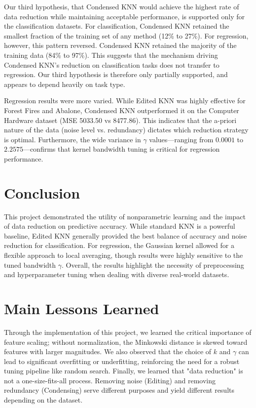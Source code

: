 \documentclass[twoside,11pt]{article}
\begin{document}
Our third hypothesis, that Condensed KNN would achieve the highest rate of data reduction while maintaining acceptable performance, is supported only for the classification datasets. For classification, Condensed KNN retained the smallest fraction of the training set of any method (12\% to 27\%). For regression, however, this pattern reversed. Condensed KNN retained the majority of the training data (84\% to 97\%). This suggests that the mechanism driving Condensed KNN's reduction on classification tasks does not transfer to regression. Our third hypothesis is therefore only partially supported, and appears to depend heavily on task type.

Regression results were more varied. While Edited KNN was highly effective for Forest Fires and Abalone, Condensed KNN outperformed it on the Computer Hardware dataset (MSE 5033.50 vs 8477.86). This indicates that the a-priori nature of the data (noise level vs. redundancy) dictates which reduction strategy is optimal. Furthermore, the wide variance in $\gamma$ values—ranging from $0.0001$ to $2.2575$—confirms that kernel bandwidth tuning is critical for regression performance.


\section{Conclusion}

This project demonstrated the utility of nonparametric learning and the impact of data reduction on predictive accuracy. While standard KNN is a powerful baseline, Edited KNN generally provided the best balance of accuracy and noise reduction for classification. For regression, the Gaussian kernel allowed for a flexible approach to local averaging, though results were highly sensitive to the tuned bandwidth $\gamma$. Overall, the results highlight the necessity of preprocessing and hyperparameter tuning when dealing with diverse real-world datasets.


\newpage

\appendix
\section{Main Lessons Learned}
Through the implementation of this project, we learned the critical importance of feature scaling; without normalization, the Minkowski distance is skewed toward features with larger magnitudes. We also observed that the choice of $k$ and $\gamma$ can lead to significant overfitting or underfitting, reinforcing the need for a robust tuning pipeline like random search. Finally, we learned that "data reduction" is not a one-size-fits-all process. Removing noise (Editing) and removing redundancy (Condensing) serve different purposes and yield different results depending on the dataset.
\end{document}
